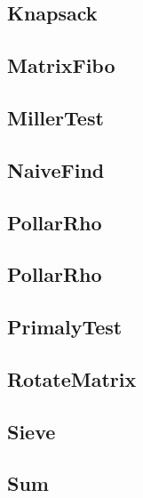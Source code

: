 \subsection{ Knapsack}
\raggedbottom
\hrulefill
\subsection{ MatrixFibo}
\raggedbottom
\hrulefill
\subsection{ MillerTest}
\raggedbottom
\hrulefill
\subsection{ NaiveFind}
\raggedbottom
\hrulefill
\subsection{ PollarRho}
\raggedbottom
\hrulefill
\subsection{ PollarRho}
\raggedbottom
\hrulefill
\subsection{ PrimalyTest}
\raggedbottom
\hrulefill
\subsection{ RotateMatrix}
\raggedbottom
\hrulefill
\subsection{ Sieve}
\raggedbottom
\hrulefill
\subsection{ Sum}
\raggedbottom
\hrulefill
